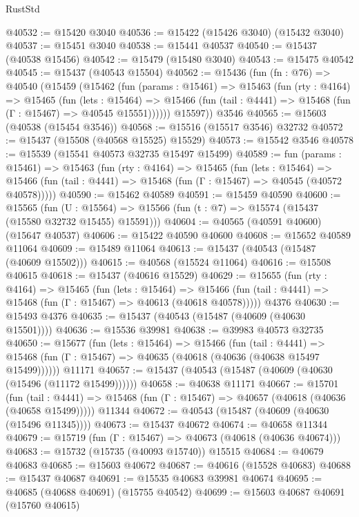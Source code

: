 \begin{lexlean}{RustStd}
\begin{coremodule}
@40532 := @15420 @3040
@40536 := @15422 (@15426 @3040) (@15432 @3040)
@40537 := @15451 @3040
@40538 := @15441 @40537
@40540 := @15437 (@40538 @15456)
@40542 := @15479 (@15480 @3040)
@40543 := @15475 @40542
@40545 := @15437 (@40543 @15504)
@40562 := @15436
    (fun (fn : @76) =>
    @40540
      (@15459
        (@15462
          (fun (params : @15461) =>
          @15463
            (fun (rty : @4164) =>
            @15465
              (fun (lets : @15464) =>
              @15466 (fun (tail : @4441) => @15468 (fun (Γ : @15467) => @40545 @15551))))))
        @15597))
    @3546
@40565 := @15603 (@40538 (@15454 @3546))
@40568 := @15516 (@15517 @3546) @32732
@40572 := @15437 (@15508 (@40568 @15525) @15529)
@40573 := @15542 @3546
@40578 := @15539 (@15541 @40573 @32735 @15497 @15499)
@40589 := fun (params : @15461) =>
  @15463
    (fun (rty : @4164) =>
    @15465
      (fun (lets : @15464) =>
      @15466 (fun (tail : @4441) => @15468 (fun (Γ : @15467) => @40545 (@40572 @40578)))))
@40590 := @15462 @40589
@40591 := @15459 @40590
@40600 := @15565
    (fun (U : @15564) => @15566 (fun (t : @7) => @15574 (@15437 (@15580 @32732 @15455) @15591)))
@40604 := @40565 (@40591 @40600) (@15647 @40537)
@40606 := @15422 @40590 @40600
@40608 := @15652 @40589 @11064
@40609 := @15489 @11064
@40613 := @15437 (@40543 (@15487 (@40609 @15502)))
@40615 := @40568 (@15524 @11064)
@40616 := @15508 @40615
@40618 := @15437 (@40616 @15529)
@40629 := @15655
    (fun (rty : @4164) =>
    @15465
      (fun (lets : @15464) =>
      @15466 (fun (tail : @4441) => @15468 (fun (Γ : @15467) => @40613 (@40618 @40578)))))
    @4376
@40630 := @15493 @4376
@40635 := @15437 (@40543 (@15487 (@40609 (@40630 @15501))))
@40636 := @15536 @39981
@40638 := @39983 @40573 @32735
@40650 := @15677
    (fun (lets : @15464) =>
    @15466
      (fun (tail : @4441) =>
      @15468 (fun (Γ : @15467) => @40635 (@40618 (@40636 (@40638 @15497 @15499))))))
    @11171
@40657 := @15437 (@40543 (@15487 (@40609 (@40630 (@15496 (@11172 @15499))))))
@40658 := @40638 @11171
@40667 := @15701
    (fun (tail : @4441) => @15468 (fun (Γ : @15467) => @40657 (@40618 (@40636 (@40658 @15499)))))
    @11344
@40672 := @40543 (@15487 (@40609 (@40630 (@15496 @11345))))
@40673 := @15437 @40672
@40674 := @40658 @11344
@40679 := @15719 (fun (Γ : @15467) => @40673 (@40618 (@40636 @40674)))
@40683 := @15732 (@15735 (@40093 @15740)) @15515
@40684 := @40679 @40683
@40685 := @15603 @40672
@40687 := @40616 (@15528 @40683)
@40688 := @15437 @40687
@40691 := @15535 @40683 @39981 @40674
@40695 := @40685 (@40688 @40691) (@15755 @40542)
@40699 := @15603 @40687 @40691 (@15760 @40615)

\end{coremodule}
\end{lexlean}
